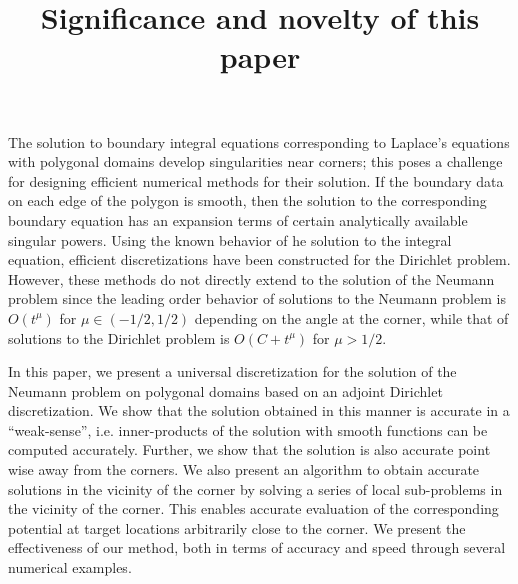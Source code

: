 \documentclass[12pt,times]{elsarticle}
\begin{document}
 \title{Significance and novelty of this paper}
 \maketitle
The solution to boundary integral equations corresponding to Laplace's equations
with polygonal domains
develop singularities near corners; this poses a challenge for designing
efficient numerical methods for their solution. 
If the boundary data on each edge of the polygon is smooth, then the solution
to the corresponding boundary equation has an expansion terms of certain analytically
available singular powers. 
Using the known behavior of he solution to the integral equation, efficient
discretizations have been constructed for the Dirichlet problem.
However, these methods do not directly extend to the solution of the Neumann problem
since the leading order behavior of solutions to the Neumann problem is $O(t^{\mu})$ 
for $\mu \in (-1/2,1/2)$ depending on the angle at the corner, while that of solutions
to the Dirichlet problem is $O(C + t^{\mu})$ for $\mu>1/2$. 

In this paper, we present a universal discretization for the solution of the Neumann problem
on polygonal domains based on an adjoint Dirichlet discretization.
We show that the solution obtained in this manner is accurate in a ``weak-sense'', i.e. 
inner-products of the solution with smooth functions can be computed accurately. 
Further, we show that the solution is also accurate point wise away from the corners. 
We also present an algorithm to obtain accurate solutions in the vicinity of the corner
by solving a series of local sub-problems in the vicinity of the corner. 
This enables accurate evaluation of the corresponding potential at target locations arbitrarily
close to the corner. We present the effectiveness of our method, both in terms of accuracy
and speed through several numerical examples.
\end{document}
